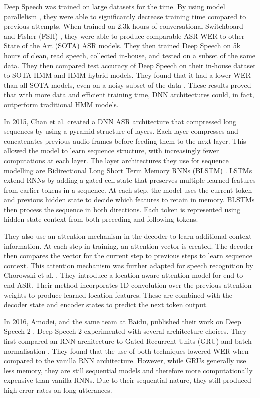 Deep Speech was trained on large datasets for the time. By using model parallelism \cite{hannun2014deep}, they were able to significantly decrease training time compared to previous attempts. When trained on 2.3k hours of conversational Switchboard \cite{godfreyswitchboard1992} and Fisher (FSH) \cite{cieri2004fisher}, they were able to produce comparable ASR WER to other State of the Art (SOTA) ASR models. They then trained Deep Speech on 5k hours of clean, read speech, collected in-house, and tested on a subset of the same data. They then compared test accuracy of Deep Speech on their in-house dataset to SOTA HMM and HMM hybrid models. They found that it had a lower WER than all SOTA models, even on a noisy subset of the data \cite{hannun2014deep}. These results proved that with more data and efficient training time, DNN architectures could, in fact, outperform traditional HMM models.

In 2015, Chan et al. \cite{chan2015listen} created a DNN ASR architecture that compressed long sequences by using a pyramid structure of layers. Each layer compresses and concatenates previous audio frames before feeding them to the next layer. This allowed the model to learn sequence structure, with increasingly fewer computations at each layer. The layer architectures they use for sequence modelling are  Bidirectional Long Short Term Memory RNNs (BLSTM) \cite{Graves2012}. LSTMs extend RNNs by adding a gated cell state that preserves multiple learned features from earlier tokens in a sequence. At each step, the model uses the current token and previous hidden state to decide which features to retain in memory. BLSTMs then process the sequence in both directions. Each token is represented using hidden state context from both preceding and following tokens.

They also use an attention mechanism in the decoder to learn additional context information. At each step in training, an attention vector is created. The decoder then compares the vector for the current step to previous steps to learn sequence context. This attention mechanism was further adapted for speech recognition by Chorowski et al. \cite{chorowski2015attention}. They introduce a location-aware attention model for end-to-end ASR. Their method incorporates 1D convolution over the previous attention weights to produce learned location features. These are combined with the decoder state and encoder states to predict the next token output.

In 2016, Amodei, and the same team at Baidu, published their work on Deep Speech 2 \cite{amodei2016deep}. Deep Speech 2 experimented with several architecture choices. They first compared an RNN architecture to Gated Recurrent Units (GRU) \cite{cho2014grulearning} and batch normalisation \cite{pmlr-v37-ioffe15}. They found that the use of both techniques lowered WER when compared to the vanilla RNN architecture. However, while GRUs generally use less memory, they are still sequential models and therefore more computationally expensive than vanilla RNNs. Due to their sequential nature, they still produced high error rates on long utterances. 

